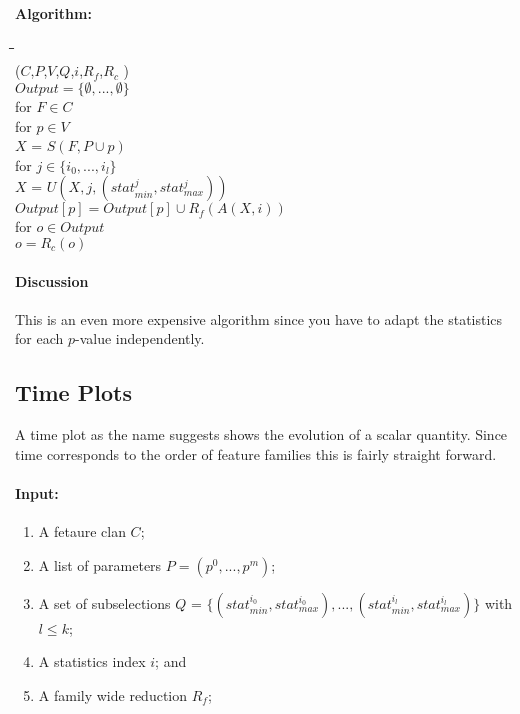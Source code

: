 \documentclass[journal]{vgtc}         %
\begin{document}
\paragraph{Algorithm:}
\begin{tabbing}
\=\hspace{0.2in}\=\hspace{0.2in}\=\hspace{0.2in}\=\hspace{0.2in}\=\\
($C$,$P$,$V$,$Q$,$i$,$R_f$,$R_c$ ) \\
\>\>$Output = \{\emptyset,...,\emptyset\}$\\
\>\>for $F \in C$\\
\>\>\>for $p \in V$\\
\>\>\>\>$X$ = $S(F,P\cup p)$\\
\>\>\>\>for $j \in \{i_0,...,i_l\}$\\
\>\>\>\>\>$X$ = $U(X,j,(stat_{min}^{j},stat_{max}^{j}))$\\
\>\>\>\>$Output[p] = Output[p] \cup R_f(A(X,i))$\\
\>\>for $o \in Output$\\
\>\>\>$o = R_c(o)$
\end{tabbing}

\paragraph{Discussion}

This is an even more expensive algorithm since you have to adapt the statistics
for each $p$-value independently.


\subsection{Time Plots}

A time plot as the name suggests shows the evolution of a scalar quantity. Since
time corresponds to the order of feature families this is fairly straight
forward.

\paragraph{Input:}

\begin{enumerate}
\item A fetaure clan $C$;
\item A list of parameters $P = (p^0,...,p^m)$; 
\item A set of subselections $Q$ = $\{(stat_{min}^{i_0},stat_{max}^{i_0}), ... ,
  (stat_{min}^{i_l},stat_{max}^{i_l})\}$ with $l \le k$; 
\item A statistics index $i$; and
\item A family wide reduction $R_f$; 
\end{enumerate}
\end{document}

